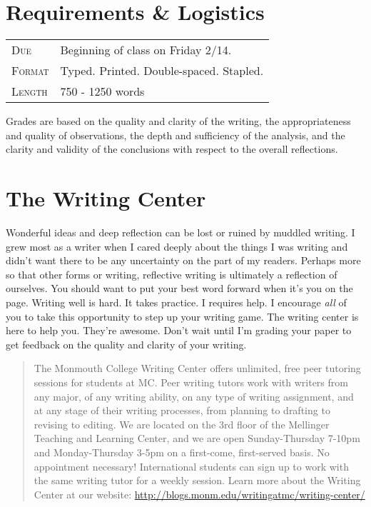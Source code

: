 \documentclass[]{tufte-handout}
\begin{document}
\section{Requirements \& Logistics}

\begin{tabular}{ll}
\textsc{Due} & Beginning of class on Friday 2/14. \\
\textsc{Format} & Typed. Printed. Double-spaced. Stapled. \\
\textsc{Length} & 750 - 1250 words 
\end{tabular}

Grades are based on the quality and clarity of the writing, the appropriateness and quality of observations, the depth and sufficiency of the analysis, and the clarity and validity of the conclusions with respect to the overall reflections.  

\section{The Writing Center}

Wonderful ideas and deep reflection can be lost or ruined by muddled writing.  I grew most as a writer when I cared deeply about the things I was writing and didn't want there to be any uncertainty on the part of my readers. Perhaps more so that other forms or writing, reflective writing is ultimately a reflection of ourselves. You should want to put your best word forward when it's you on the page. Writing well is hard. It takes practice. I requires help. I encourage \textit{all} of you to take this opportunity to step up your writing game. The writing center is here to help you. They're awesome. Don't wait until I'm grading your paper to get feedback on the quality and clarity of your writing. 
\begin{quote}
The Monmouth College Writing Center offers unlimited, free peer tutoring sessions for students at MC.  Peer writing tutors work with writers from any major, of any writing ability, on any type of writing assignment, and at any stage of their writing processes, from planning to drafting to revising to editing.  We are located on the 3rd floor of the Mellinger Teaching and Learning Center, and we are open Sunday-Thursday 7-10pm and Monday-Thursday 3-5pm on a first-come, first-served basis.  No appointment necessary!  International students can sign up to work with the same writing tutor for a weekly session. Learn more about the Writing Center at our website: \url{http://blogs.monm.edu/writingatmc/writing-center/}
\end{quote}
\end{document}
